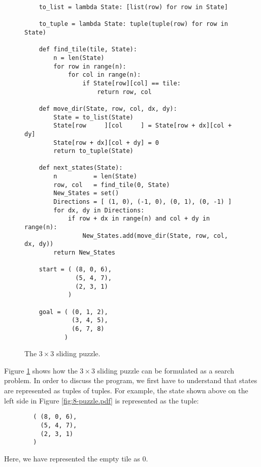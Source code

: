 \begin{figure}[!ht]
\centering
\begin{verbatim}
    to_list = lambda State: [list(row) for row in State]
    
    to_tuple = lambda State: tuple(tuple(row) for row in State)
    
    def find_tile(tile, State):
        n = len(State)
        for row in range(n):
            for col in range(n):
                if State[row][col] == tile:
                    return row, col
    
    def move_dir(State, row, col, dx, dy):
        State = to_list(State)
        State[row     ][col     ] = State[row + dx][col + dy]
        State[row + dx][col + dy] = 0
        return to_tuple(State)
    
    def next_states(State):
        n          = len(State)
        row, col   = find_tile(0, State)
        New_States = set()
        Directions = [ (1, 0), (-1, 0), (0, 1), (0, -1) ]
        for dx, dy in Directions:
            if row + dx in range(n) and col + dy in range(n):
                New_States.add(move_dir(State, row, col, dx, dy))
        return New_States
    
    start = ( (8, 0, 6),
              (5, 4, 7),
              (2, 3, 1)
            )

    goal = ( (0, 1, 2), 
             (3, 4, 5), 
             (6, 7, 8)
           )
\end{verbatim}
\vspace*{-0.3cm}
\caption{The $3 \times 3$ sliding puzzle.}
\label{fig:Sliding-Puzzle.ipynb}
\end{figure}
Figure \ref{fig:Sliding-Puzzle.ipynb} shows how the $3 \times 3$ sliding puzzle can be formulated as
a search problem.  In order to discuss the program, we first have to understand that states are
represented as tuples of tuples.  For example, the state shown above on the left side in Figure
\ref{fig:8-puzzle.pdf} is represented as the tuple:
\begin{verbatim}
        ( (8, 0, 6),
          (5, 4, 7),
          (2, 3, 1)
        )
\end{verbatim}
Here, we have represented the empty tile as $0$.
